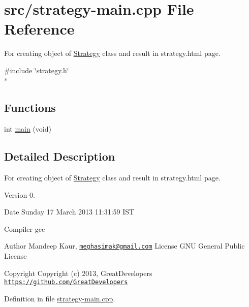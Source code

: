 \hypertarget{strategy-main_8cpp}{\section{src/strategy-\/main.cpp File Reference}
\label{strategy-main_8cpp}
}


For creating object of \hyperlink{classStrategy}{Strategy} class and result in strategy.\-html page.  


{\ttfamily \#include \char`\"{}strategy.\-h\char`\"{}}\\*
\subsection*{Functions}
\begin{DoxyCompactItemize}
\item 
int \hyperlink{strategy-main_8cpp_a840291bc02cba5474a4cb46a9b9566fe}{main} (void)
\end{DoxyCompactItemize}


\subsection{Detailed Description}
For creating object of \hyperlink{classStrategy}{Strategy} class and result in strategy.\-html page. \begin{DoxyVersion}{Version}
0. 
\end{DoxyVersion}
\begin{DoxyDate}{Date}
Sunday 17 March 2013 11\-:31\-:59 I\-S\-T\par
 Compiler gcc
\end{DoxyDate}
\begin{DoxyAuthor}{Author}
Mandeep Kaur, \href{mailto:meghasimak@gmail.com}{\tt meghasimak@gmail.\-com} License G\-N\-U General Public License 
\end{DoxyAuthor}
\begin{DoxyCopyright}{Copyright}
Copyright (c) 2013, Great\-Developers \href{https://github.com/GreatDevelopers}{\tt https\-://github.\-com/\-Great\-Developers} 
\end{DoxyCopyright}


Definition in file \hyperlink{strategy-main_8cpp_source}{strategy-\/main.\-cpp}.



